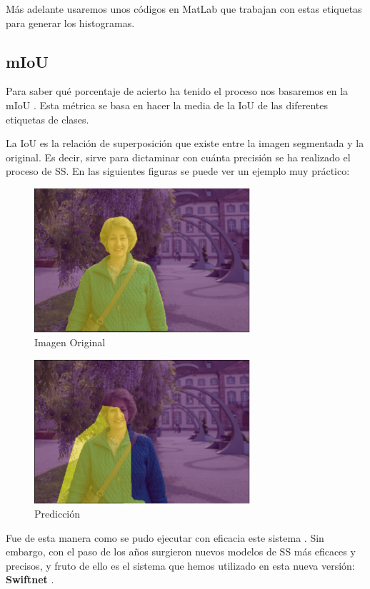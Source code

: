 Más adelante usaremos unos códigos en MatLab que trabajan con estas etiquetas para generar los histogramas.

\subsection{mIoU}

Para saber qué porcentaje de acierto ha tenido el proceso nos basaremos en la \ac{mIoU} \cite{miou-iou}. Esta métrica se basa en hacer la media de la \ac{IoU} de las diferentes etiquetas de clases.

La \ac{IoU} \cite{miou-iou} es la relación de superposición que existe entre la imagen segmentada y la original. Es decir, sirve para dictaminar con cuánta precisión se ha realizado el proceso de \ac{SS}. En las siguientes figuras se puede ver un ejemplo muy práctico:

\begin{figure}[H]
  \centering
  \includegraphics[width=8cm]{Figuras/Iou_1.eps}
  \caption{Imagen Original}
\end{figure}

\begin{figure}[H]
  \centering
  \includegraphics[width=8cm]{Figuras/IoU_2.eps}
  \caption{Predicción}
\end{figure}


Fue de esta manera como se pudo ejecutar con eficacia este sistema \cite{isa2}. Sin embargo, con el paso de los años surgieron nuevos modelos de \ac{SS} más eficaces y precisos, y fruto de ello es el sistema que hemos utilizado en esta nueva versión: \textbf{Swiftnet} \cite{swiftnet}.


